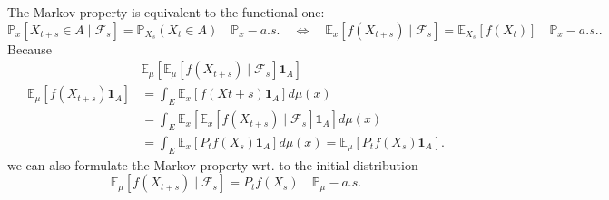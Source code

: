 \documentclass[a4paper,12pt,twoside]{article}
\begin{document}

The Markov property is equivalent to the functional one: 
\[
\mathbb{P}_x[ X_{t+s} \in A \mid \mathcal{F}_s ] = \mathbb{P}_{X_s}(X_t \in A) \quad \mathbb{P}_x-a.s. \quad \iff \quad \mathbb{E}_x [ f(X_{t+s}) \mid \mathcal{F}_s ]= \mathbb{E}_{X_s}[ f(X_t) ]\quad \mathbb{P}_x-a.s..
\]
Because 
\begin{align*}
    &\mathbb{E}_\mu[ \mathbb{E}_\mu [ f(X_{t+s}) \mid \mathcal{F}_s ] \textbf{1}_A ]\\
    \mathbb{E}_\mu[ f(X_{t+s}) \textbf{1}_A ]&= \int_E \mathbb{E}_x[ f(X{t+s}) \textbf{1}_A ] d \mu (x) \\
    &= \int_E \mathbb{E}_x[ \mathbb{E}_x [ f(X_{t+s}) \mid \mathcal{F}_s ] \textbf{1}_A ]d \mu (x)\\
    &= \int_E \mathbb{E}_x [ P_t f(X_s) \textbf{1}_A] d \mu (x) = \mathbb{E}_\mu[ P_t f(X_s) \textbf{1}_A ].
\end{align*}
we can also formulate the Markov property wrt. to the initial distribution
\[
 \mathbb{E}_\mu [ f(X_{t+s}) \mid \mathcal{F}_s ] = P_t f(X_s) \quad \mathbb{P}_\mu-a.s.
\]
\end{document}
